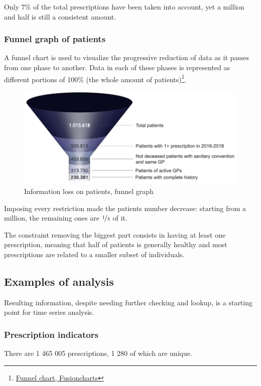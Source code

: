 Only 7\% of the total prescriptions have been taken into account, yet a million and half is still a consistent amount.

\subsubsection{Funnel graph of patients}
A funnel chart is used to visualize the progressive reduction of data as it passes from one phase to another. Data in each of these phases is represented as different portions of 100\% (the whole amount of patients)\footnote{\href{https://www.fusioncharts.com/resources/chart-primers/funnel-chart}{Funnel chart, Fusioncharts}}.

\begin{figure}[h]
	\centering
	\includegraphics[scale=0.4]{images/funnel.png}
	\caption{\small Information loss on patients, funnel graph}
\end{figure}

Imposing every restriction made the patients number decrease: starting from a million, the remaining ones are $\nicefrac{1}{4}$ of it.

The constraint removing the biggest part consists in having at least one prescription, meaning that half of patients is generally healthy and most prescriptions are related to a smaller subset of individuals.

\subsection{Examples of analysis}
Resulting information, despite needing further checking and lookup, is a starting point for time series analysis.

\subsubsection{Prescription indicators}
There are 1 465 005 prescriptions, 1 280 of which are unique.

